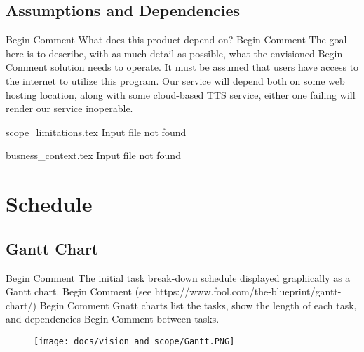                                                                                                                                                                                                                                                                                                                                                                                                                                                                                                                                                                                                                                                                                                                                                                                                                                                                                                                                                                                                                                                                                                                                                                                                                                                                                                                                                                                                                                                                                                                                                                                                                                                                                                                                                                                                                                                                                                                                                                                                                                                                                                                                                                                                                                                                                                                                                                                                                                                                                                                                                                                                                                                                                                                                                                                                                                                                                                                                                                                                                                                                                                                                                                                                                                                                                                                                                                                                                                                                                                                                                                                                                                                                                                                                                                                                                                                                                                                                                                                                                                                                                                                                                                                                                                                                                                                                                                                                                                                                                                                                                                                                                                                                                                                                                                                                                                                                                                                                                                                                                                                                                                                                                                                                                                                                                                                                                                                                                                                                                                                                                                                                                                                                                                                                                                                                                                                                                                                                                                                                                                                                                                                                                                                                                                                                                                                                                                                                                                                                                                                                                                                                                                                                                                                                                                                                                                                                                                                                \documentclass[letterpaper,12pt]{article}
\begin{document}
\subsection{Assumptions and Dependencies}
Begin Comment  What does this product depend on?  
Begin Comment  The goal here is to describe, with as much detail as possible, what the envisioned
Begin Comment  solution needs to operate.  
It must be assumed that users have access to the internet to utilize this program. Our service will depend both on some web hosting location, along with some cloud-based TTS service, either one failing will render our service inoperable.

scope_limitations.tex Input file not found 

busness_context.tex Input file not found 

\section{Schedule}

\subsection{Gantt Chart}
Begin Comment  The initial task break-down schedule displayed graphically as a Gantt chart.
Begin Comment  (see https://www.fool.com/the-blueprint/gantt-chart/)
Begin Comment  Gnatt charts list the tasks, show the length of each task, and dependencies
Begin Comment  between tasks.  
\begin{figure}[h]
\texttt{[image: docs/vision\_and\_scope/Gantt.PNG]}
\end{figure}
\end{document}
